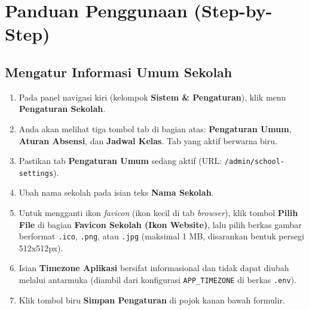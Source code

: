 \section{Panduan Penggunaan (Step-by-Step)}

\subsection{Mengatur Informasi Umum Sekolah}
\begin{enumerate}
    \item Pada panel navigasi kiri (kelompok \textbf{Sistem \& Pengaturan}), klik menu \textbf{Pengaturan Sekolah}.
    \item Anda akan melihat tiga tombol tab di bagian atas: \textbf{Pengaturan Umum}, \textbf{Aturan Absensi}, dan \textbf{Jadwal Kelas}. Tab yang aktif berwarna biru.
    \item Pastikan tab \textbf{Pengaturan Umum} sedang aktif (URL: \texttt{/admin/school-settings}).
    \item Ubah nama sekolah pada isian teks \textbf{Nama Sekolah}.
    \item Untuk mengganti ikon \textit{favicon} (ikon kecil di tab \textit{browser}), klik tombol \textbf{Pilih File} di bagian \textbf{Favicon Sekolah (Ikon Website)}, lalu pilih berkas gambar berformat \texttt{.ico}, \texttt{.png}, atau \texttt{.jpg} (maksimal 1 MB, disarankan bentuk persegi 512x512px).
    \item Isian \textbf{Timezone Aplikasi} bersifat informasional dan tidak dapat diubah melalui antarmuka (diambil dari konfigurasi \texttt{APP\_TIMEZONE} di berkas \texttt{.env}).
    \item Klik tombol biru \textbf{Simpan Pengaturan} di pojok kanan bawah formulir.
\end{enumerate}

